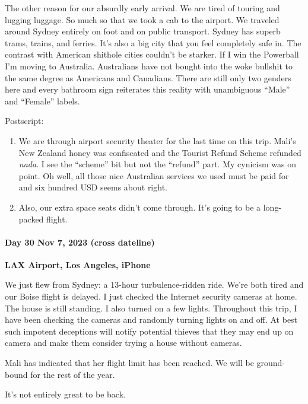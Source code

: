 The other reason for our absurdly early arrival. We are tired of touring
and lugging luggage. So much so that we took a cab to the airport. We
traveled around Sydney entirely on foot and on public transport. Sydney
has superb trams, trains, and ferries. It's also a big city that you
feel completely safe in. The contrast with American shithole cities
couldn't be starker. If I win the Powerball I'm moving to Australia.
Australians have not bought into the woke bullshit to the same degree as
Americans and Canadians. There are still only two genders here and every
bathroom sign reiterates this reality with unambiguous ``Male'' and
``Female'' labels.

Postscript:

\begin{enumerate}
\def\labelenumi{\arabic{enumi}.}
\item
  We are through airport security theater for the last time on this
  trip. Mali's New Zealand honey was confiscated and the Tourist Refund
  Scheme refunded \emph{nada}. I see the ``scheme'' bit but not the
  ``refund'' part. My cynicism was on point. Oh well, all those
  nice Australian services we used must be paid for and six hundred USD
  seems about right.
\item
  Also, our extra space seats didn't come through. It's going to be a
  long-packed flight.
\end{enumerate}

\hypertarget{day-30-nov-7-2023-cross-dateline-lax-airport-los-angeles-iphone}{%
\paragraph{\texorpdfstring{\textbf{Day 30 Nov 7, 2023 (cross dateline)}}{Day 30 Nov 7, 2023 (cross dateline)}}\label{day-30-nov-7-2023-cross-dateline-lax-airport-los-angeles-iphone}}

\textbf{LAX Airport, Los Angeles, iPhone}

We just flew from Sydney: a 13-hour turbulence-ridden ride. We're both
tired and our Boise flight is delayed. I just checked the Internet
security cameras at home. The house is still standing. I also turned on
a few lights. Throughout this trip, I have been checking the cameras and
randomly turning lights on and off. At best such impotent deceptions
will notify potential thieves that they may end up on camera and make
them consider trying a house without cameras.

Mali has indicated that her flight limit has been reached. We will be
ground-bound for the rest of the year.

It's not entirely great to be back.

%

